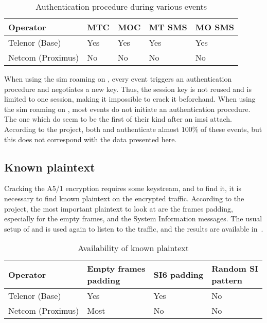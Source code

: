       \begin{table}[h]
        \centering
        \begin{tabular}{@{}lllll@{}}
          \toprule
          Operator          & MTC & MOC & MT SMS & MO SMS \\
          \midrule
          Telenor (Base)    & Yes & Yes & Yes    & Yes    \\
          Netcom (Proximus) & No  & No  & No     & No     \\
          \bottomrule
        \end{tabular}
        \caption{Authentication procedure during various events}
        \label{tab:events_authentication}
      \end{table}

      When using the  \gls{sim} roaming on ,
      every event triggers an authentication procedure and negotiates a
      new key. Thus, the session key is not reused and is limited to one
      session, making it impossible to crack it beforehand. When using
      the  \gls{sim} roaming on , most
      events do not initiate an authentication procedure. The one which
      do seem to be the first of their kind after an \gls{imsi} attach.
      According to the  project, both  and
       authenticate almost $100\%$ of these events, but
      this does not correspond with the data presented here.

    \subsection{Known plaintext}

      Cracking the A5/1 encryption requires some keystream, and to find
      it, it is necessary to find known plaintext on the encrypted
      traffic. According to the  project, the most
      important plaintext to look at are the frames padding, especially
      for the empty frames, and the System Information messages. The
      usual setup of  and  is used again
      to listen to the traffic, and the results are available
      in~.

      \begin{table}[h]
        \centering
        \begin{tabular}{@{}llll@{}}
          \toprule
          Operator & \parbox[t]{2.2cm}{Empty frames\\ padding} & SI6
          padding & \parbox[t]{1.7cm}{Random SI\\ pattern}\\
          \midrule
          Telenor (Base)    & Yes   & Yes & No    \\
          Netcom (Proximus) & Most  & No  & No    \\
          \bottomrule
        \end{tabular}
        \caption{Availability of known plaintext}
        \label{tab:plaintext}
      \end{table}

